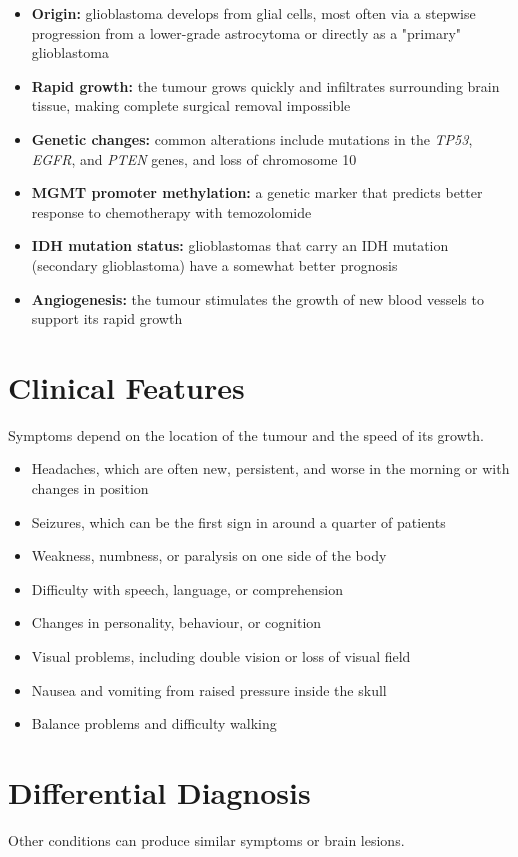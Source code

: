 \begin{itemize}
    \item \textbf{Origin:} glioblastoma develops from glial cells, most often via a stepwise progression from a lower-grade astrocytoma or directly as a "primary" glioblastoma
    \item \textbf{Rapid growth:} the tumour grows quickly and infiltrates surrounding brain tissue, making complete surgical removal impossible
    \item \textbf{Genetic changes:} common alterations include mutations in the \textit{TP53}, \textit{EGFR}, and \textit{PTEN} genes, and loss of chromosome 10
    \item \textbf{MGMT promoter methylation:} a genetic marker that predicts better response to chemotherapy with temozolomide
    \item \textbf{IDH mutation status:} glioblastomas that carry an IDH mutation (secondary glioblastoma) have a somewhat better prognosis
    \item \textbf{Angiogenesis:} the tumour stimulates the growth of new blood vessels to support its rapid growth
\end{itemize}

\section*{Clinical Features}
Symptoms depend on the location of the tumour and the speed of its growth.

\begin{itemize}
    \item Headaches, which are often new, persistent, and worse in the morning or with changes in position
    \item Seizures, which can be the first sign in around a quarter of patients
    \item Weakness, numbness, or paralysis on one side of the body
    \item Difficulty with speech, language, or comprehension
    \item Changes in personality, behaviour, or cognition
    \item Visual problems, including double vision or loss of visual field
    \item Nausea and vomiting from raised pressure inside the skull
    \item Balance problems and difficulty walking
\end{itemize}

\section*{Differential Diagnosis}
Other conditions can produce similar symptoms or brain lesions.

